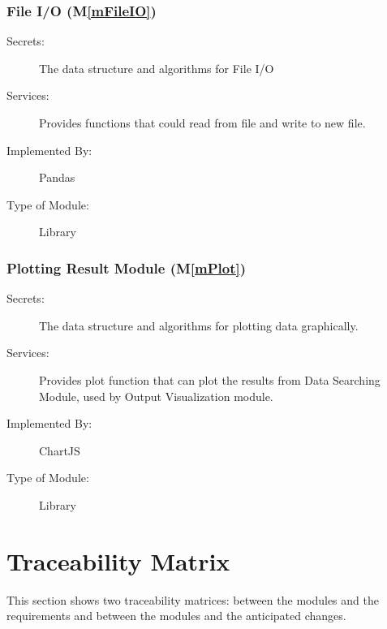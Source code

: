 \documentclass[12pt, titlepage]{article}
\newcommand{\mref}[1]{M\ref{#1}}
\begin{document}
\subsubsection{File I/O (\mref{mFileIO})}
\begin{description}
\item[Secrets:] The data structure and algorithms for File I/O 
\item[Services:] Provides functions that could read from file and write to new file. 
\item[Implemented By:] Pandas
\item[Type of Module:] Library
\end{description}

\subsubsection{Plotting Result Module (\mref{mPlot})}
\begin{description}
\item[Secrets:] The data structure and algorithms for plotting data graphically. 
\item[Services:] Provides plot function that can plot the results from Data Searching Module, used by Output Visualization module. 
\item[Implemented By:] ChartJS 
\item[Type of Module:] Library
\end{description}

\section{Traceability Matrix} \label{SecTM}

This section shows two traceability matrices: between the modules and the
requirements and between the modules and the anticipated changes.
\end{document}
